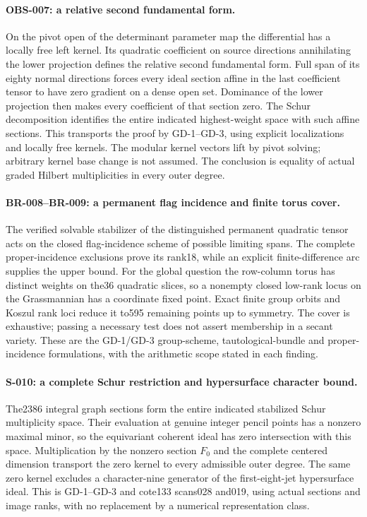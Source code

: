 \paragraph{OBS-007: a relative second fundamental form.}
On the pivot open of the determinant parameter map the differential
has a locally free left kernel. Its quadratic coefficient on
source directions annihilating the lower projection defines the
relative second fundamental form. Full span of its eighty normal
directions forces every ideal section affine in the last coefficient
tensor to have zero gradient on a dense open set. Dominance of the
lower projection then makes every coefficient of that section zero.
The Schur decomposition identifies the entire indicated highest-weight
space with such affine sections. This transports the proof by
GD-1--GD-3, using explicit localizations and locally free kernels.
The modular kernel vectors lift by pivot solving; arbitrary kernel
base change is not assumed. The conclusion is equality of actual
graded Hilbert multiplicities in every outer degree.

\paragraph{BR-008--BR-009: a permanent flag incidence and finite torus cover.}
The verified solvable stabilizer of the distinguished permanent
quadratic tensor acts on the closed flag-incidence scheme of possible
limiting spans. The complete proper-incidence exclusions prove its
rank18, while an explicit finite-difference arc supplies the upper
bound. For the global question the row-column torus has distinct
weights on the36 quadratic slices, so a nonempty closed low-rank
locus on the Grassmannian has a coordinate fixed point. Exact finite
group orbits and Koszul rank loci reduce it to595 remaining points
up to symmetry. The cover is exhaustive; passing a necessary test
does not assert membership in a secant variety. These are the
GD-1/GD-3 group-scheme, tautological-bundle and proper-incidence
formulations, with the arithmetic scope stated in each finding.

\paragraph{S-010: a complete Schur restriction and hypersurface character bound.}
The2386 integral graph sections form the entire indicated stabilized
Schur multiplicity space. Their evaluation at genuine integer pencil
points has a nonzero maximal minor, so the equivariant coherent ideal
has zero intersection with this space. Multiplication by the nonzero
section $F_0$ and the complete centered dimension transport the zero
kernel to every admissible outer degree. The same zero kernel excludes
a character-nine generator of the first-eight-jet hypersurface ideal.
This is GD-1--GD-3 and cote133 scans028 and019, using actual sections
and image ranks, with no replacement by a numerical representation class.

